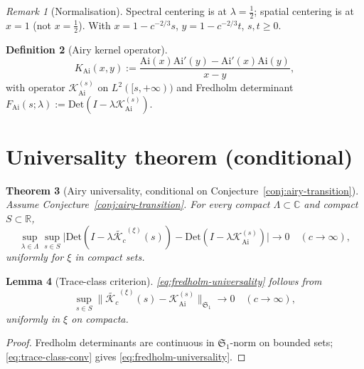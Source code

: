 \documentclass[12pt,a4paper]{amsart}
\newtheorem{theorem}{Theorem}[section]
\newtheorem{lemma}[theorem]{Lemma}
\theoremstyle{definition}
\newtheorem{definition}[theorem]{Definition}
\theoremstyle{remark}
\newtheorem{remark}[theorem]{Remark}
\newcommand{\norm}[1]{\|#1\|}
\newcommand{\Kc}{\mathcal{K}_c}
\newcommand{\Kairy}{\mathcal{K}_{\mathrm{Ai}}}
\newcommand{\Ai}{\mathrm{Ai}}
\newcommand{\R}{\mathbb{R}}
\newcommand{\Det}{\mathrm{Det}}
\begin{document}
\begin{remark}[Normalisation]
\label{rem:normalisation}
Spectral centering is at $\lambda=\tfrac12$; spatial centering is at
$x=1$ (not $x=\tfrac12$). With $x=1-c^{-2/3}s$, $y=1-c^{-2/3}t$,
$s,t\ge 0$.
\end{remark}

\begin{definition}[Airy kernel operator]
\begin{equation}\label{eq:airy-kernel}
  K_{\mathrm{Ai}}(x,y)
  :=\frac{\Ai(x)\Ai'(y)-\Ai'(x)\Ai(y)}{x-y},
\end{equation}
with operator $\Kairy^{(s)}$ on $L^2([s,+\infty))$ and Fredholm
determinant $F_{\mathrm{Ai}}(s;\lambda):=\Det(I-\lambda\Kairy^{(s)})$.
\end{definition}

\section{Universality theorem (conditional)}
\label{sec:universality}

\begin{theorem}[Airy universality, conditional on
  Conjecture~\ref{conj:airy-transition}]
\label{thm:universality}
Assume Conjecture~\ref{conj:airy-transition}.
For every compact $\Lambda\subset\mathbb{C}$ and compact $S\subset\R$,
\begin{equation}\label{eq:fredholm-universality}
  \sup_{\lambda\in\Lambda}\sup_{s\in S}
  \bigl|\Det(I-\lambda\widetilde{\Kc}^{(\xi)}(s))
       -\Det(I-\lambda\Kairy^{(s)})\bigr|
  \longrightarrow 0\quad(c\to\infty),
\end{equation}
uniformly for $\xi$ in compact sets.
\end{theorem}

\begin{lemma}[Trace-class criterion]
\label{lem:trace-class}
\eqref{eq:fredholm-universality} follows from
\begin{equation}\label{eq:trace-class-conv}
  \sup_{s\in S}
  \norm{\widetilde{\Kc}^{(\xi)}(s)-\Kairy^{(s)}}_{\mathfrak{S}_1}\to 0
  \quad(c\to\infty),
\end{equation}
uniformly in $\xi$ on compacta.
\end{lemma}

\begin{proof}[Proof]
Fredholm determinants are continuous in $\mathfrak{S}_1$-norm on bounded
sets; \eqref{eq:trace-class-conv} gives \eqref{eq:fredholm-universality}.
\end{proof}
\end{document}
